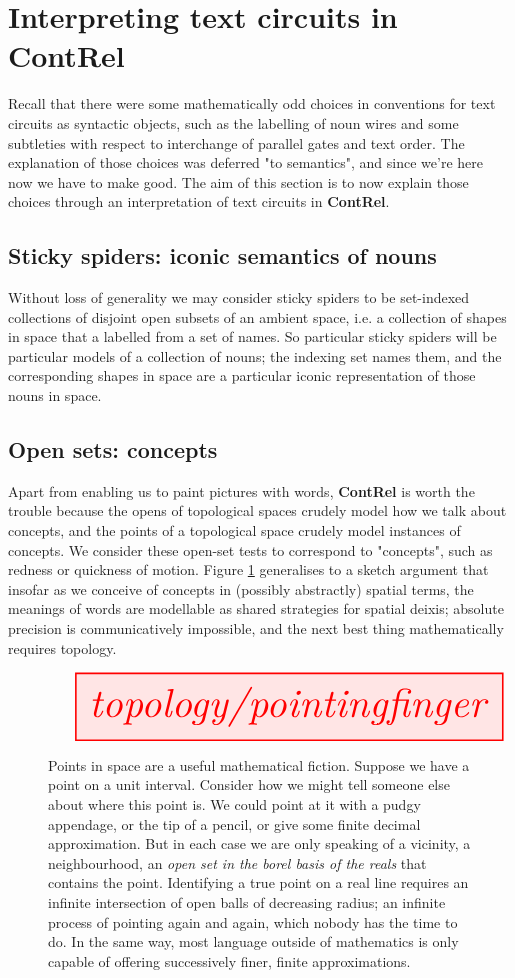 \section{Interpreting text circuits in \textbf{ContRel}}

Recall that there were some mathematically odd choices in conventions for text circuits as syntactic objects, such as the labelling of noun wires and some subtleties with respect to interchange of parallel gates and text order. The explanation of those choices was deferred "to semantics", and since we're here now we have to make good. The aim of this section is to now explain those choices through an interpretation of text circuits in \textbf{ContRel}.

\subsection{Sticky spiders: iconic semantics of nouns}
Without loss of generality we may consider sticky spiders to be set-indexed collections of disjoint open subsets of an ambient space, i.e. a collection of shapes in space that a labelled from a set of names. So particular sticky spiders will be particular models of a collection of nouns; the indexing set names them, and the corresponding shapes in space are a particular iconic representation of those nouns in space.

\subsection{Open sets: concepts}

Apart from enabling us to paint pictures with words, \textbf{ContRel} is worth the trouble because the opens of topological spaces crudely model how we talk about concepts, and the points of a topological space crudely model instances of concepts. We consider these open-set tests to correspond to "concepts", such as redness or quickness of motion. Figure \ref{fig:pointing} generalises to a sketch argument that insofar as we conceive of concepts in (possibly abstractly) spatial terms, the meanings of words are modellable as shared strategies for spatial deixis; absolute precision is communicatively impossible, and the next best thing mathematically requires topology.

\begin{figure}[h!]\label{fig:pointing}
\[\resizebox{\textwidth}{!}{\tikzfig{topology/pointingfinger}}\]
\caption{Points in space are a useful mathematical fiction. Suppose we have a point on a unit interval. Consider how we might tell someone else about where this point is. We could point at it with a pudgy appendage, or the tip of a pencil, or give some finite decimal approximation. But in each case we are only speaking of a vicinity, a neighbourhood, an \emph{open set in the borel basis of the reals} that contains the point. Identifying a true point on a real line requires an infinite intersection of open balls of decreasing radius; an infinite process of pointing again and again, which nobody has the time to do. In the same way, most language outside of mathematics is only capable of offering successively finer, finite approximations.}
\end{figure}

